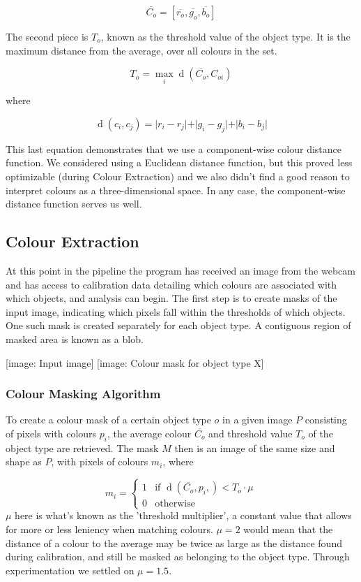 \documentclass[10pt,twocolumn]{article}
\DeclareMathOperator{\dist}{d}
\begin{document}
\[
\overline{C_o} = [ \overline{r_o},\overline{g_o},\overline{b_o} ]
\]

The second piece is $T_o$, known as the threshold value of the object type. It is the maximum distance from the average, over all colours in the set.

\[
T_o = \max_{i} \dist( \overline{C_o}, C_{oi} )
\]

where

\[
\dist(c_i,c_j) = \vert r_{i}-r_{j} \vert + \vert g_{i}-g_{j} \vert + \vert b_{i}-b_{j} \vert 
\]

This last equation demonstrates that we use a component-wise colour distance function. We considered using a Euclidean distance function, but this proved less optimizable (during Colour Extraction) and we also didn't find a good reason to interpret colours as a three-dimensional space. In any case, the component-wise distance function serves us well.

\subsection{Colour Extraction}
At this point in the pipeline the program has received an image from the webcam and has access to calibration data detailing which colours are associated with which objects, and analysis can begin. The first step is to create masks of the input image, indicating which pixels fall within the thresholds of which objects. One such mask is created separately for each object type. A contiguous region of masked area is known as a blob.

[image: Input image] [image: Colour mask for object type X]

\subsubsection{Colour Masking Algorithm}
To create a colour mask of a certain object type $o$ in a given image $P$ consisting of pixels with colours $p_i$, the average colour $\overline{C_o}$ and threshold value $T_o$ of the object type are retrieved. The mask $M$ then is an image of the same size and shape as $P$, with pixels of colours $m_i$, where

\[
m_i =
	\begin{cases}
	1 & \mbox{if } \dist( \overline{C_o}, p_i, ) < T_o \cdot \mu \\
	0 & \mbox{otherwise}
	\end{cases}
\]
$\mu$ here is what's known as the 'threshold multiplier', a constant value that allows for more or less leniency when matching colours. $\mu = 2$ would mean that the distance of a colour to the average may be twice as large as the distance found during calibration, and still be masked as belonging to the object type. Through experimentation we settled on $\mu = 1.5$.
\end{document}
